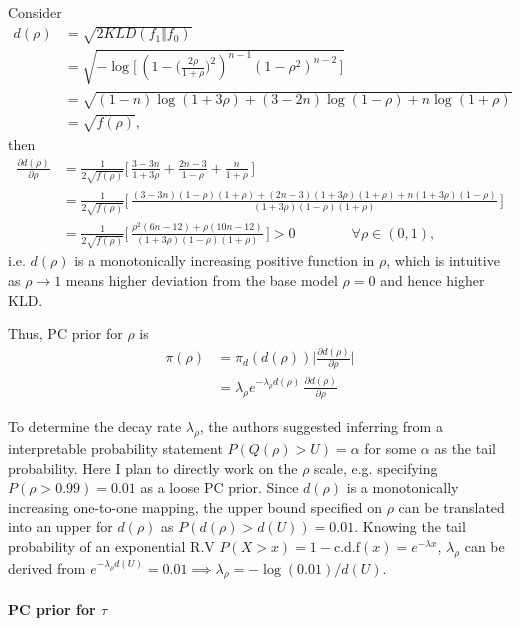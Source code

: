 \documentclass[12pt,a4paper]{article}
\begin{document}
Consider 
\begin{align*}
d(\rho) &= \sqrt{2 KLD(f_1 \Vert f_0)} \\
&= \sqrt{- \log \big[ \, (1- \big(\frac{2\rho}{1+\rho}\big)^2 )^{n-1} (1-\rho^2)^{n-2}\, \big]} \tag{1}\\
&= \sqrt{(1-n) \log(1+3\rho) + (3-2n) \log(1-\rho) + n \log(1+\rho)}\\
&= \sqrt{f(\rho)},
\end{align*}
then 
\begin{align*}
\frac{\partial d(\rho)}{\partial\rho} &= \frac{1}{2\sqrt{f(\rho)}} \Big[\, \frac{3-3n}{1+3\rho} + \frac{2n-3}{1-\rho} + \frac{n}{1+\rho} \,\Big] \\
&= \frac{1}{2\sqrt{f(\rho)}} \Big[\, \frac{(3-3n)(1-\rho)(1+\rho) + (2n-3)(1+3\rho)(1+\rho) + n(1+3\rho)(1-\rho)}{(1+3\rho)(1-\rho)(1+\rho)}   \,\Big] \\
&= \frac{1}{2\sqrt{f(\rho)}} \Big[\, \frac{\rho^2(6n-12) + \rho(10n - 12)}{(1+3\rho)(1-\rho)(1+\rho)}\,\Big] > 0 \qquad \qquad \forall \rho \in (0, 1),
\end{align*}
i.e. $d(\rho)$ is a monotonically increasing positive function in $\rho$, which is intuitive as $\rho \to 1$ means higher deviation from the base model $\rho = 0$ and hence higher KLD. 

Thus, PC prior for $\rho$ is
\begin{align*}
\pi(\rho) &= \pi_{d}(d(\rho)) \Big \vert \frac{\partial d(\rho)}{\partial\rho} \Big \vert \\
&= \lambda_{\rho} e^{-\lambda_{\rho} d(\rho)} \, \frac{\partial d(\rho)}{\partial \rho}
\end{align*}

To determine the decay rate $\lambda_{\rho}$, the authors suggested inferring from a interpretable probability statement $P(Q(\rho) > U) = \alpha$ for some $\alpha$ as the tail probability. Here I plan to directly work on the $\rho$ scale, e.g. specifying $P(\rho > 0.99) = 0.01$ as a loose PC prior. Since $d(\rho)$ is a monotonically increasing one-to-one mapping, the upper bound specified on $\rho$ can be translated into an upper for $d(\rho)$ as $P(d(\rho) > d(U)) = 0.01$. Knowing the tail probability of an exponential R.V $P(X > x) = 1 - \text{c.d.f}(x) = e^{-\lambda x}$, $\lambda_\rho$ can be derived from $e^{-\lambda_{\rho} d(U)} = 0.01 \implies \lambda_\rho = -\log(0.01) / d(U)$.

\paragraph{PC prior for $\tau$} \\~\\
\end{document}
